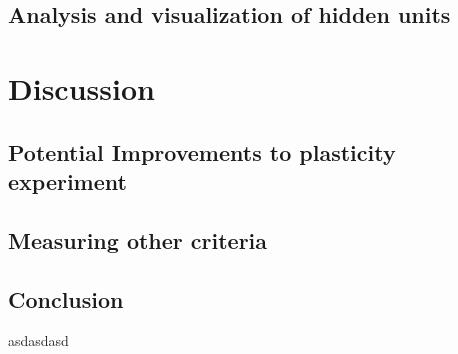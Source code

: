 \documentclass[12pt]{article}
\begin{document}
	\subsection{Analysis and visualization of hidden units}
	
\section{Discussion}

	\subsection{Potential Improvements to plasticity experiment}
	
	\subsection{Measuring other criteria}
	
	\subsection{Conclusion}



\begin{thebibliography}{99}
\singlespacing

 asdasdasd

\end{thebibliography}
\end{document}
